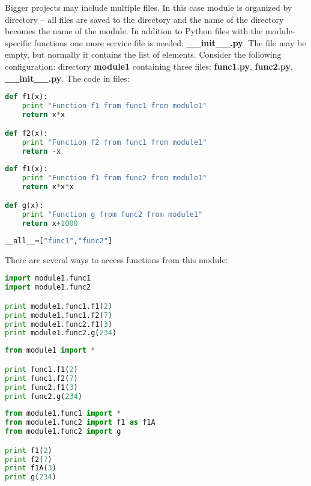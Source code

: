 Bigger projects may include multiple files. In this case
module is organized by directory -- all files are saved to
the directory and the name of the directory becomes the
name of the module. In addition to Python files with
the module-specific functions one more service file is needed:
\textbf{{\_\_}init{\_\_}.py}. The file may be empty, but normally
it contains the list of elements. Consider the following
configuration: directory \textbf{module1} containing
three files: \textbf{func1.py}, \textbf{func2.py}, 
\textbf{{\_\_}init{\_\_}.py}. The code in files:

\begin{lstlisting}[language=Python,style=codelst2,caption={Python: sample module -- file \textbf{finc1.py}}]
def f1(x):
    print "Function f1 from func1 from module1"
    return x*x

def f2(x):
    print "Function f2 from func1 from module1"
    return -x
\end{lstlisting}

\begin{lstlisting}[language=Python,style=codelst2,caption={Python: sample module -- file \textbf{finc2.py}}]
def f1(x):
    print "Function f1 from func2 from module1"
    return x*x*x

def g(x):
    print "Function g from func2 from module1"
    return x+1000
\end{lstlisting}

\begin{lstlisting}[language=Python,style=codelst2,caption={Python: sample module -- file \textbf{{\_\_}init{\_\_}.py}}]
__all__=["func1","func2"]
\end{lstlisting}

There are several ways to access functions from this module:


\begin{lstlisting}[language=Python,style=codelst2,caption={Python: accessing module functions - 1}]
import module1.func1
import module1.func2

print module1.func1.f1(2)
print module1.func1.f2(7)
print module1.func2.f1(3)
print module1.func2.g(234)
\end{lstlisting}

\begin{lstlisting}[language=Python,style=codelst2,caption={Python: accessing module functions - 2}]
from module1 import *

print func1.f1(2)
print func1.f2(7)
print func2.f1(3)
print func2.g(234)
\end{lstlisting}

\begin{lstlisting}[language=Python,style=codelst2,caption={Python: accessing module functions - 3}]
from module1.func1 import *
from module1.func2 import f1 as f1A
from module1.func2 import g

print f1(2)
print f2(7)
print f1A(3)
print g(234)
\end{lstlisting}




